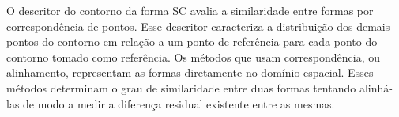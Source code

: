 





O descritor do contorno da forma \ac{SC} \cite{Belongie:2002} avalia a similaridade entre formas por correspondência de pontos. Esse descritor caracteriza a distribuição dos demais pontos do contorno em relação a um ponto de referência para cada ponto do contorno tomado como referência. 
Os métodos que usam correspondência, ou alinhamento, representam as formas diretamente no domínio espacial. Esses métodos determinam o grau de similaridade entre duas formas tentando alinhá-las de modo a medir a diferença residual existente entre as mesmas.


